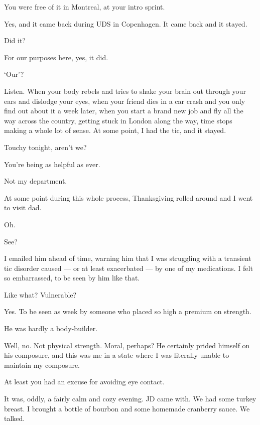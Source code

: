 \begin{paracol}{2}
\begin{leftcolumn}
\begin{ally}
You were free of it in Montreal, at your intro sprint.
\end{ally}
Yes, and it came back during UDS in Copenhagen. It came back and it stayed.

\begin{ally}
Did it?
\end{ally}
For our purposes here, yes, it did.

\begin{ally}
`Our'?
\end{ally}
Listen. When your body rebels and tries to shake your brain out through your ears and dislodge your eyes, when your friend dies in a car crash and you only find out about it a week later, when you start a brand new job and fly all the way across the country, getting stuck in London along the way, time stops making a whole lot of sense. At some point, I had the tic, and it stayed.

\begin{ally}
Touchy tonight, aren't we?
\end{ally}
You're being as helpful as ever.

\begin{ally}
Not my department.
\end{ally}
At some point during this whole process, Thanksgiving rolled around and I went to visit dad.

\begin{ally}
Oh.
\end{ally}
See?

I emailed him ahead of time, warning him that I was struggling with a transient tic disorder caused --- or at least exacerbated --- by one of my medications. I felt so embarrassed, to be seen by him like that.

\begin{ally}
Like what? Vulnerable?
\end{ally}
Yes. To be seen as week by someone who placed so high a premium on strength.

\begin{ally}
He was hardly a body-builder.
\end{ally}
Well, no. Not physical strength. Moral, perhaps? He certainly prided himself on his composure, and this was me in a state where I was literally unable to maintain my composure.

\begin{ally}
At least you had an excuse for avoiding eye contact.
\end{ally}
It was, oddly, a fairly calm and cozy evening. JD came with. We had some turkey breast. I brought a bottle of bourbon and some homemade cranberry sauce. We talked.


\end{leftcolumn}
\end{paracol}
